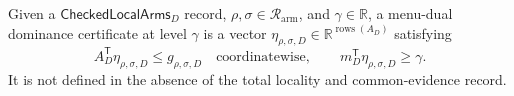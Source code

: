 Given a \(\mathsf{CheckedLocalArms}_D\) record, \(\rho,\sigma\in\mathcal R_{\mathrm{arm}}\), and \(\gamma\in\mathbb R\), a menu-dual dominance certificate at level \(\gamma\) is a vector \(\eta_{\rho,\sigma,D}\in\mathbb R^{\operatorname{rows}(A_D)}\) satisfying
\[
A_D^{\mathsf T}\eta_{\rho,\sigma,D}
\leq g_{\rho,\sigma,D}
\quad\text{coordinatewise},
\qquad
m_D^{\mathsf T}\eta_{\rho,\sigma,D}\geq\gamma.
\]
It is not defined in the absence of the total locality and common-evidence record.